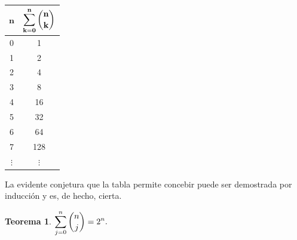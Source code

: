 \documentclass{article}
\theoremstyle{definition}
\newtheorem{teor}{Teorema}
\begin{document}
\begin{center}
\begin{tabular}
{|c|c|} \hline
\rowcolor{verde}
$\mathbf{n}$ & $\mathbf{\displaystyle \sum_{k=0}^{n} \displaystyle \binom{n}{k}}$\\
\hline \hline
\rowcolor{azul} 0 & 1\\
\hline
\rowcolor{azul} 1 & 2\\
\hline
\rowcolor{azul} 2& 4\\
\hline
\rowcolor{azul} 3& 8\\
\hline
\rowcolor{azul} 4& 16\\
\hline
\rowcolor{azul} 5& 32\\
\hline
\rowcolor{azul} 6& 64\\
\hline
\rowcolor{azul} 7& 128\\
\hline
\rowcolor{azul} $\vdots$ & $\vdots$\\
\hline


   
\end{tabular}
\end{center}
La evidente conjetura que la tabla permite concebir puede ser demostrada por inducción y es, de hecho, cierta.
\begin{teor}
$\displaystyle \sum_{j=0}^{n} \displaystyle \binom{n}{j}=2^n.$
\end{teor}\label{teo3}
\end{document}
